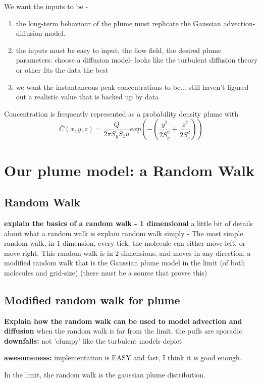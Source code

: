 \documentclass[11pt]{article} %
\begin{document}
We want the inputs to be -
\begin{enumerate}
	\item the long-term behaviour of the plume must replicate the Gaussian advection-diffusion model.
	\item the inputs must be easy to input,   the flow field, the desired plume parameters:  choose a diffusion model- looks like the turbulent diffusion theory or other fits the data the best
	\item we want the instantaneous peak concentrations to be...  still haven't figured out a realistic value that is backed up by data
	
\end{enumerate}

Concentration is frequently represented as a probability density plume with $$\bar{ C}(x,y,z) = \frac{Q}{2 \pi S_y S_z \bar{u}} exp\left(-\left(\frac{y^2}{2S_y^2} +\frac{z^2}{2S^2_z}\right)\right)$$


\section{Our plume model: a Random Walk}

\subsection{Random Walk} {\bf explain the basics of a random walk - 1 dimensional}
	a little bit of details about what a random walk is
explain random walk simply - The most simple random walk, in 1 dimension, every tick, the molecule can either move left, or move right.  This random walk is in 2 dimensions, and moves in any direction.
a modified random walk that is the Gaussian plume model in the limit (of both molecules and grid-size) (there must be a source that proves this) 


\subsection{Modified random walk for plume}{\bf Explain how the random walk can be used to model advection and diffusion }
when the random walk is far from the limit, the puffs are sporadic.  {\bf downfalls: } not 'clumpy' like the turbulent models depict

{\bf awesomeness: } implementation is EASY and fast,  I think it is good enough.


In the limit, the random walk is the gaussian plume distribution.
\end{document}
